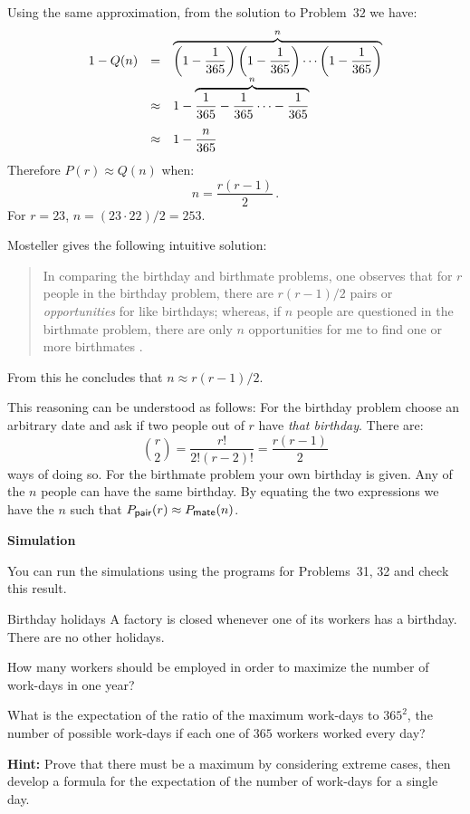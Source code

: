Using the same approximation, from the solution to Problem~$32$ we have:
\[
\renewcommand*{\arraystretch}{2.2}
\begin{array}{lcl}
1-Q(n)
&=&\overbrace{\left(1-\frac{1}{365}\right)
  \left(1-\frac{1}{365}\right)\cdots
  \left(1-\frac{1}{365}\right)}^{n}\\
&\approx& 1-\overbrace{\frac{1}{365}-\frac{1}{365}\cdots-
  \frac{1}{365}}^{n}\\
&\approx& 1-\disfrac{n}{365}\\
\end{array}
\]
Therefore $P(r)\approx Q(n)$ when:
\[
n=\frac{r(r-1)}{2}\,.
\]
For $r=23$, $n=(23\cdot 22)/2=253$.


Mosteller gives the following intuitive solution:
\begin{quote}
In comparing the birthday and birthmate problems, one observes that for $r$ people in the birthday problem, there are $r(r-1)/2$ pairs or \emph{opportunities} for like birthdays; whereas, if $n$ people are questioned in the birthmate problem, there are only $n$ opportunities for me to find one or more birthmates \cite[p.~322]{birthday}.
\end{quote}
From this he concludes that $n\approx r(r-1)/2$.

This reasoning can be understood as follows: For the birthday problem choose an arbitrary date and ask if two people out of $r$ have \emph{that birthday}. There are:
\[
{r \choose 2}=\frac{r!}{2!(r-2)!} = \frac{r(r-1)}{2}
\]
ways of doing so. For the birthmate problem your own birthday is given. Any of the $n$ people can have the same birthday. By equating the two expressions we have the $n$ such that $P_{\textsf{\footnotesize pair}}(r) \approx P_{\textsf{\footnotesize mate}}(n)$.

\medskip

\textbf{Simulation}

You can run the simulations using the programs for Problems~31, 32 and check this result.


\newpage

\begin{prob}{Birthday holidays}
A factory is closed whenever one of its workers has a birthday. There are no other holidays.

 How many workers should be employed in order to maximize the number of work-days in one year?

 What is the expectation of the ratio of the maximum work-days to $365^2$, the number of possible work-days if each one of $365$ workers worked every day?

\textbf{Hint:} Prove that there must be a maximum by considering extreme cases, then develop a formula for the expectation of the number of work-days for a single day.
\end{prob}

